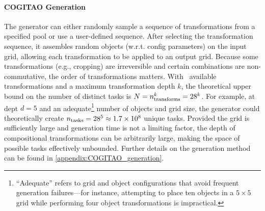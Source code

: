 \paragraph{COGITAO Generation} 

The generator can either randomly sample a sequence of transformations from a specified pool or use a user-defined sequence. After selecting the transformation sequence, it assembles random objects (w.r.t. config parameters) on the input grid, allowing each transformation to be applied to an output grid. 
Because some transformations (e.g., cropping) are irreversible and certain combinations are non-commutative, the order of transformations matters. With \ntransforms\ available transformations and a maximum transformation depth $k$, the theoretical upper bound on the number of distinct tasks is $N = n_{\text{transforms}}^{k} = 28^{k}$.
For example, at dept $d = 5$ and an adequate\footnote{``Adequate'' refers to grid and object configurations that avoid frequent generation failures—for instance, attempting to place ten objects in a $5 \times 5$ grid while performing four object transformations is impractical.} number of objects and grid size, the generator could theoretically create $n_{\text{tasks}} = 28^{5} \approx 1.7 \times 10^{8}$ unique tasks. 
Provided the grid is sufficiently large and generation time is not a limiting factor, the depth of compositional transformations can be arbitrarily large, making the space of possible tasks effectively unbounded. Further details on the generation method can be found in \ref{appendix:COGITAO_generation}.